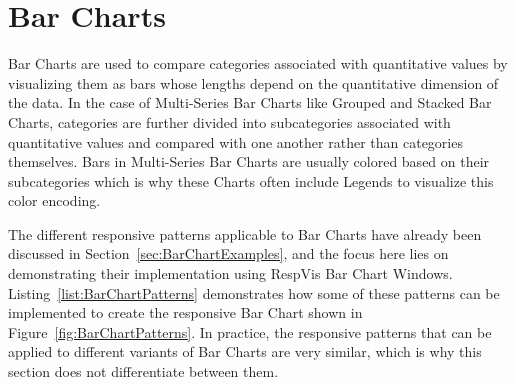 \section{Bar Charts}
\label{sec:BarChartsUsage}

Bar Charts are used to compare categories associated with quantitative
values by visualizing them as bars whose lengths depend on the
quantitative dimension of the data.  In the case of Multi-Series Bar
Charts like Grouped and Stacked Bar Charts, categories are further
divided into subcategories associated with quantitative values and
compared with one another rather than categories themselves.  Bars in
Multi-Series Bar Charts are usually colored based on their
subcategories which is why these Charts often include Legends to
visualize this color encoding.

The different responsive patterns applicable to Bar Charts have
already been discussed in Section~\ref{sec:BarChartExamples}, and the
focus here lies on demonstrating their implementation using RespVis
Bar Chart Windows.  Listing~\ref{list:BarChartPatterns} demonstrates
how some of these patterns can be implemented to create the responsive
Bar Chart shown in Figure~\ref{fig:BarChartPatterns}.  In practice,
the responsive patterns that can be applied to different variants of
Bar Charts are very similar, which is why this section does not
differentiate between them.


